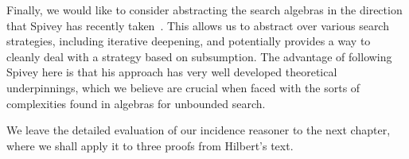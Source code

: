 Finally, we would like to consider abstracting the search algebras in the direction that Spivey has recently taken~\cite{SearchAlgebras}. This allows us to abstract over various search strategies, including iterative deepening, and potentially provides a way to cleanly deal with a strategy based on subsumption. The advantage of following Spivey here is that his approach has very well developed theoretical underpinnings, which we believe are crucial when faced with the sorts of complexities found in algebras for unbounded search.

We leave the detailed evaluation of our incidence reasoner to the next chapter, where we shall apply it to three proofs from Hilbert's text.
